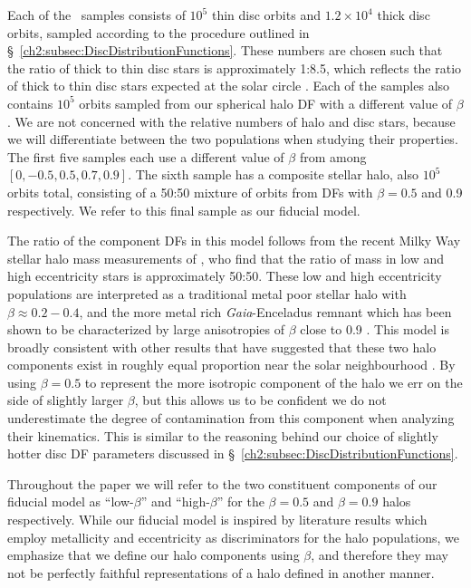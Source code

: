 Each of the \solar\ samples consists of $10^{5}$ thin disc orbits and $1.2\times10^{4}$ thick disc orbits, sampled according to the procedure outlined in \S~\ref{ch2:subsec:DiscDistributionFunctions}. These numbers are chosen such that the ratio of thick to thin disc stars is approximately 1:8.5, which reflects the ratio of thick to thin disc stars expected at the solar circle \parencite[e.g. see the potential of][]{mcmillan17}. Each of the samples also contains $10^{5}$ orbits sampled from our spherical halo DF with a different value of $\beta$. We are not concerned with the relative numbers of halo and disc stars, because we will differentiate between the two populations when studying their properties. The first five samples each use a different value of $\beta$ from among $[0,-0.5,0.5,0.7,0.9]$. The sixth sample has a composite stellar halo, also $10^{5}$ orbits total, consisting of a 50:50 mixture of orbits from DFs with $\beta=0.5$ and 0.9 respectively. We refer to this final sample as our fiducial model. 

The ratio of the component DFs in this model follows from the recent Milky Way stellar halo mass measurements of \textcite{mackereth20}, who find that the ratio of mass in low and high eccentricity stars is approximately 50:50. These low and high eccentricity populations are interpreted as a traditional metal poor stellar halo with $\beta \approx 0.2-0.4$, and the more metal rich \textit{Gaia}-Enceladus remnant which has been shown to be characterized by large anisotropies of $\beta$ close to 0.9 \parencite{belokurov18,fattahi19,iorio21}. This model is broadly consistent with other results that have suggested that these two halo components exist in roughly equal proportion near the solar neighbourhood \parencite{belokurov18,lancaster19,iorio21}. By using $\beta=0.5$ to represent the more isotropic component of the halo we err on the side of slightly larger $\beta$, but this allows us to be confident we do not underestimate the degree of contamination from this component when analyzing their kinematics. This is similar to the reasoning behind our choice of slightly hotter disc DF parameters discussed in \S~\ref{ch2:subsec:DiscDistributionFunctions}.

Throughout the paper we will refer to the two constituent components of our fiducial model as ``low-$\beta$'' and ``high-$\beta$'' for the $\beta=0.5$ and $\beta=0.9$ halos respectively. While our fiducial model is inspired by literature results which employ metallicity and eccentricity as discriminators for the halo populations, we emphasize that we define our halo components using $\beta$, and therefore they may not be perfectly faithful representations of a halo defined in another manner. 

